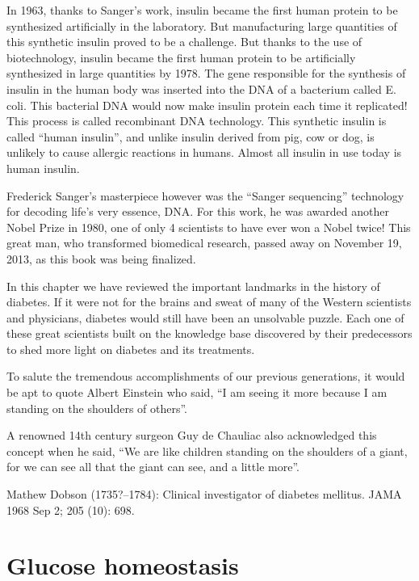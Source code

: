 In 1963, thanks to Sanger’s work, insulin became the first human protein to be synthesized artificially in the laboratory. But manu\-factu\-ring large quantities of this synthetic insulin proved to be a challenge. But thanks to the use of biotechnology, insulin became the first human protein to be artificially synthesized in large quantities by 1978. The gene responsible for the synthesis of insulin in the human body was inserted into the DNA of a ba\-cterium called E. coli. This bacterial DNA would now make insulin protein each time it replicated! This process is called recombinant DNA technology. This synthetic insu\-lin is called “human insulin”, and unlike insulin derived from pig, cow or dog, is unlikely to cause allergic reactions in humans. Almost all insu\-lin in use today is human insulin.

\clearpage

Frederick Sanger’s masterpiece however was the “Sanger seque\-ncing” technology for decoding life’s very essence, DNA. For this work, he was awarded another Nobel Prize in 1980, one of only 4 scientists to have ever won a Nobel twice! This great man, who transformed biomedical research, passed away on Nove\-mber 19, 2013, as this book was being finalized.

In this chapter we have reviewed the important landmarks in the history of diabetes. If it were not for the brains and sweat of many of the Western scientists and physicians, diabetes would still have been an unsolvable puzzle. Each one of these great scientists built on the knowledge base discovered by their predecessors to shed more light on diabetes and its treatments.

To salute the tremendous accomplishments of our previous genera\-tions, it would be apt to quote Albert Einstein who said, “I am seeing it more because I am standing on the shoulders of others”.

A renowned 14th century surgeon Guy de Chauliac also acknow\-ledged this concept when he said, “We are like children standing on the shoulders of a giant, for we can see all that the giant can see, and a little more”.

\begin{thebibliography}{99}
 Mathew Dobson (1735?–1784): Clinical investigator of diabetes mellitus. JAMA 1968 Sep 2; 205 (10): 698.
\end{thebibliography}


\chapter{Glucose homeostasis}\label{chap2}

